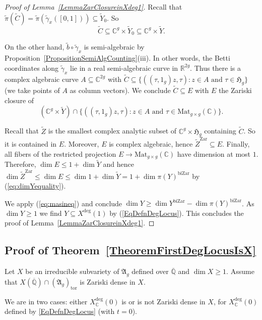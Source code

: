 \documentclass[12pt,oneside]{amsart}
\numberwithin{maincounter}{section}
\numberwithin{equation}{section}
\def\RR{\mathbb{R}}
\def\CC{\mathbb{C}}
\def\QQ{\mathbb{Q}}
\newcommand{\IC}{{\CC}}
\newcommand{\IR}{{\RR}}
\newcommand{\IQbar}{{\overline{\QQ}}}
\renewcommand{\subset}{\subseteq} %
\begin{document}
\begin{proof}[Proof of Lemma~\ref{LemmaZarClosureinXdeg1}]
  Recall that $\tilde\pi(\tilde C)=\tilde\pi(\tilde\gamma_x([0,1]))
  \subset \tilde Y_0$. So
  $$
  \tilde C \subset\IC^g \times \tilde Y_0 \subset\IC^g\times \tilde Y.
  $$

  On the other hand, $\tilde b\circ\tilde\gamma_x$ is semi-algebraic
  by Proposition~\ref{PropositionSemiAlgCounting}(iii). In other
  words, the Betti coordinates along $\tilde\gamma_x$ lie in a
  real semi-algebraic curve in $\IR^{2g}$. Thus there is a complex algebraic curve
  $A\subset\IC^{2g}$ with $\tilde C\subset \{((\tau,1_g)z,\tau) : z\in
  A\text{ and }\tau\in\mathfrak{H}_g\}$ (we take points of $A$ as
  column vectors).
  We conclude $\tilde C\subset E$ with $E$ the Zariski closure of 
  \begin{equation*}
    (\IC^g\times \tilde Y)\cap \{((\tau,1_g)z,\tau) : z\in
    A\text{ and }\tau\in\mathrm{Mat}_{g\times g}(\IC)\}.
  \end{equation*}
  
  Recall that $\tilde Z$ is the smallest complex analytic subset of
  $\IC^g\times \mathfrak{H}_g$ containing
  $\tilde C$. So it is contained in $E$. Moreover,  $E$ is complex
  algebraic, hence
    ${\tilde Z}^{\mathrm{Zar}} \subset E$.
  Finally, all fibers of the restricted projection $E\rightarrow
  \mathrm{Mat}_{g\times g}(\IC)$ have dimension at most $1$.
  Therefore, $\dim E\le 1+\dim \tilde Y$ and hence
  $\dim {\tilde Z}^{\mathrm{Zar}}\le \dim E \le \dim 1 + \dim \tilde Y = 1 +\dim
  \pi(Y)^{\mathrm{biZar}}$ by (\ref{eq:dimYequality}). 

  We apply (\ref{eq:masineq}) and conclude
  $\dim Y \ge \dim Y^{\mathrm{biZar}} - \dim \pi(Y)^{\mathrm{biZar}}$.
  As $\dim Y\ge 1$ we find $Y\subset X^{\mathrm{deg}}(1)$ by
  (\ref{EqDefnDegLocus}).
  This concludes the proof of Lemma~\ref{LemmaZarClosureinXdeg1}.
\end{proof}

\subsection{Proof of Theorem~\ref{TheoremFirstDegLocusIsX}}
Let $X$ be an irreducible subvariety of $\mathfrak{A}_g$ defined over $\IQbar$ and $\dim X \ge 1$. Assume that $X(\IQbar) \cap (\mathfrak{A}_g)_{\mathrm{tor}}$ is Zariski dense in $X$.

We are in two cases: either $X_\IC^{\mathrm{deg}}(0)$ is or is not Zariski dense
 in $X$, for $X_\IC^{\mathrm{deg}}(0)$ defined by
\eqref{EqDefnDegLocus} (with $t=0$).
\end{document}
